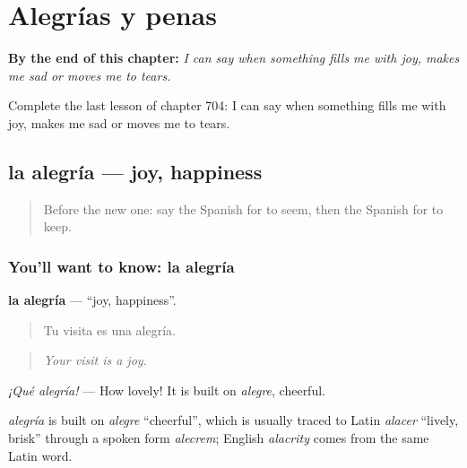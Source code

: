 
\chapter{Alegrías y penas}
\label{ch:es-alegrias-y-penas}

\begin{chapteropening}
\textbf{By the end of this chapter:} \emph{I can say when something fills me with joy, makes me sad or moves me to tears.}

Complete the last lesson of chapter 704: I can say when something fills me with joy, makes me sad or moves me to tears.
\end{chapteropening}

\section[la alegría]{la alegría — joy, happiness}

\label{lesson:ES-C704-alegria}



\begin{quote}
Before the new one: say the Spanish for to seem, then the Spanish for to keep.
\end{quote}

\subsection*{You'll want to know: la alegría}
\textbf{la alegría} — \textquotedblleft{}joy, happiness\textquotedblright{}.

\begin{quote}
Tu visita es una alegría.
\end{quote}

\begin{quote}
\emph{Your visit is a joy.}
\end{quote}

\emph{¡Qué alegría!} — How lovely! It is built on \emph{alegre}, cheerful.

\begin{cousinweb}
\emph{alegría} is built on \emph{alegre} \textquotedblleft{}cheerful\textquotedblright{}, which is usually traced to Latin \emph{alacer} \textquotedblleft{}lively, brisk\textquotedblright{} through a spoken form \emph{alecrem}; English \emph{alacrity} comes from the same Latin word.
\end{cousinweb}

